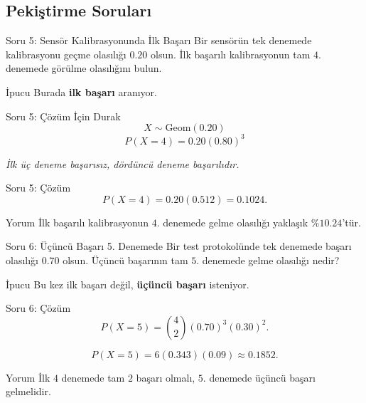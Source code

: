 \documentclass[light]{lutbeamer}
\begin{document}
\subsection{Pekiştirme Soruları}

\begin{frame}{Soru 5: Sensör Kalibrasyonunda İlk Başarı}
    \small
    Bir sensörün tek denemede kalibrasyonu geçme olasılığı \(0.20\) olsun. İlk başarılı kalibrasyonun tam \(4\). denemede görülme olasılığını bulun.

    \begin{block}{İpucu}
        Burada \textbf{ilk başarı} aranıyor.
    \end{block}
\end{frame}

\begin{frame}{Soru 5: Çözüm İçin Durak}
    \color{red!70!black}
    \small
    \[
    X \sim \text{Geom}(0.20)
    \]
    \[
    P(X=4)=0.20(0.80)^3
    \]

    \begin{center}
        \textit{İlk üç deneme başarısız, dördüncü deneme başarılıdır.}
    \end{center}
\end{frame}

\begin{frame}{Soru 5: Çözüm}
    \small
    \[
    P(X=4)=0.20(0.512)=0.1024.
    \]

    \begin{exampleblock}{Yorum}
        İlk başarılı kalibrasyonun \(4\). denemede gelme olasılığı yaklaşık \(\%10.24\)'tür.
    \end{exampleblock}
\end{frame}

\begin{frame}{Soru 6: Üçüncü Başarı 5. Denemede}
    \small
    Bir test protokolünde tek denemede başarı olasılığı \(0.70\) olsun. Üçüncü başarının tam \(5\). denemede gelme olasılığı nedir?

    \begin{block}{İpucu}
        Bu kez ilk başarı değil, \textbf{üçüncü başarı} isteniyor.
    \end{block}
\end{frame}

\begin{frame}{Soru 6: Çözüm}
    \small
    \[
    P(X=5)=\binom{4}{2}(0.70)^3(0.30)^2.
    \]

    \[
    P(X=5)=6(0.343)(0.09)\approx 0.1852.
    \]

    \begin{exampleblock}{Yorum}
        İlk \(4\) denemede tam \(2\) başarı olmalı, \(5\). denemede üçüncü başarı gelmelidir.
    \end{exampleblock}
\end{frame}
\end{document}
